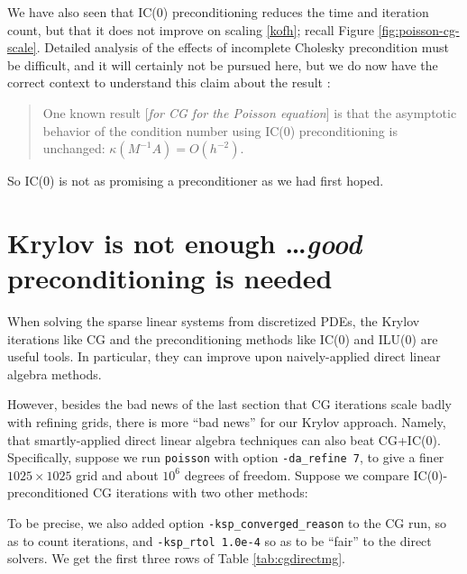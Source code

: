 We have also seen that IC($0$) preconditioning reduces the time and iteration count, but that it does not improve on scaling \eqref{kofh}; recall Figure \ref{fig:poisson-cg-scale}.  Detailed analysis of the effects of incomplete Cholesky precondition must be difficult, and it will certainly not be pursued here, but we do now have the correct context to understand this claim about the result \citet[][p.~82]{Elmanetal2005}:
\begin{quote}
One known result [\emph{for CG for the Poisson equation}] is that the asymptotic behavior of the condition number using IC($0$) preconditioning is unchanged: $\kappa(M^{-1} A) = O(h^{-2})$.
\end{quote}
So IC($0$) is not as promising a preconditioner as we had first hoped.


\section{Krylov is not enough \dots \emph{good} preconditioning is needed}

When solving the sparse linear systems from discretized PDEs, the Krylov iterations like CG and the preconditioning methods like IC($0$) and ILU($0$) are useful tools.  In particular, they can improve upon naively-applied direct linear algebra methods.

However, besides the bad news of the last section that CG iterations scale badly with refining grids, there is more ``bad news'' for our Krylov approach.  Namely, that smartly-applied direct linear algebra techniques can also beat CG+IC($0$).  Specifically, suppose we run \texttt{poisson} with option \texttt{-da\_refine 7}, to give a finer $1025 \times 1025$ grid and about $10^6$ degrees of freedom.  Suppose we compare IC($0$)-preconditioned CG iterations with two other methods:
To be precise, we also added option \texttt{-ksp\_converged\_reason} to the CG run, so as to count iterations, and \texttt{-ksp\_rtol 1.0e-4} so as to be ``fair'' to the direct solvers.  We get the first three rows of Table \ref{tab:cgdirectmg}.

